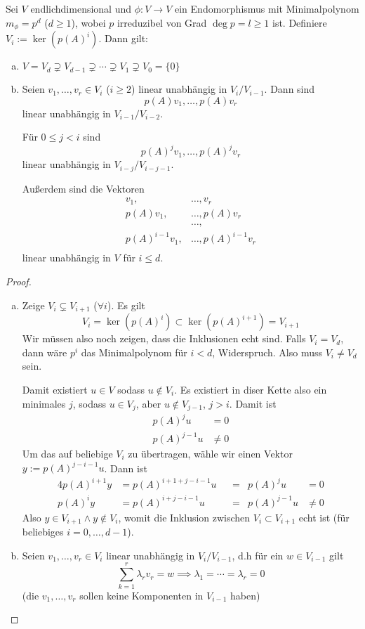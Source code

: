 \documentclass{mycourse}
\begin{document}
\begin{lem}
	\label{lem:12.13}
	Sei $V$ endlichdimensional und $\phi:V\to V$ ein Endomorphismus mit Minimalpolynom $m_\phi = p^d$ ($d\ge 1$), wobei $p$ irreduzibel von Grad $\deg p=l\ge 1$ ist.
	Definiere $V_i := \ker(p(A)^i)$.
	Dann gilt:
	\begin{enumerate}[(a)]
		\item
			$V=V_d \supsetneq V_{d-1} \supsetneq \dotsb \supsetneq V_1 \supsetneq V_0=\{0\}$
		\item
			Seien $v_1,\dotsc, v_r \in V_i$ ($i\ge 2$) linear unabhängig in $V_i/ V_{i-1}$.
			Dann sind 
			\[
				p(A)v_1,\dotsc, p(A)v_r
			\]
			linear unabhängig in $V_{i-1}/ V_{i-2}$.
			
			Für $0\le j<i$ sind 
			\[
				p(A)^jv_1, \dotsc, p(A)^jv_r
			\]
			linear unabhängig in $V_{i-j}/V_{i-j-1}$.

			Außerdem sind die Vektoren
			\begin{align*}
				v_1,&\dotsc, v_r \\
				p(A)v_1,&\dotsc, p(A)v_r \\
				 & \dotsc, \\
				p(A)^{i-1}v_1,&\dotsc, p(A)^{i-1}v_r \\
			\end{align*}
			linear unabhängig in $V$ für $i\le d$.
	\end{enumerate}
	\begin{proof}
		\begin{enumerate}[(a)]
			\item
				Zeige $V_i \subsetneq V_{i+1}$ ($\forall i$).
				Es gilt
				\[
					V_i=\ker(p(A)^i) \subset \ker(p(A)^{i+1})=V_{i+1}
				\]
				Wir müssen also noch zeigen, dass die Inklusionen echt sind.
				Falls $V_i=V_d$, dann wäre $p^i$ das Minimalpolynom für $i<d$, Widerspruch.
				Also muss $V_i\neq V_d$ sein.

				Damit existiert $u\in V$ sodass $u\not\in V_i$.
				Es existiert in diser Kette also ein minimales $j$, sodass $u\in V_j$, aber $u\not \in V_{j-1}$, $j>i$.
				Damit ist
				\begin{align*}
					p(A)^j u &= 0 \\
					p(A)^{j-1}u &\neq 0
				\end{align*}
				Um das auf beliebige $V_i$ zu übertragen, wähle wir einen Vektor $y:= p(A)^{j-i-1}u$.
				Dann ist
				\begin{alignat*}{4}
					p(A)^{i+1}y &= p(A)^{i+1+j-i-1}u &&= &p(A)^ju &= 0 \\
					   p(A)^i y &= p(A)^{i+j-i-1}u&&= &p(A)^{j-1} u &\neq 0
				\end{alignat*}
				Also $y\in V_{i+1} \land y\not\in V_i$, womit die Inklusion zwischen $V_{i} \subset V_{i+1}$ echt ist (für beliebiges $i=0,\dotsc,d-1$).				
			\item
				Seien $v_1,\dotsc, v_r \in V_i$ linear unabhängig in $V_i/ V_{i-1}$, d.h für ein $w\in V_{i-1}$ gilt
				\[
					\sum_{k=1}^{r}\lambda_rv_r = w \implies \lambda_1 = \dotsb = \lambda_r = 0
				\]
				(die $v_1,\dotsc,v_r$ sollen keine Komponenten in $V_{i-1}$ haben)


\end{enumerate}
\end{proof}
\end{lem}
\end{document}
